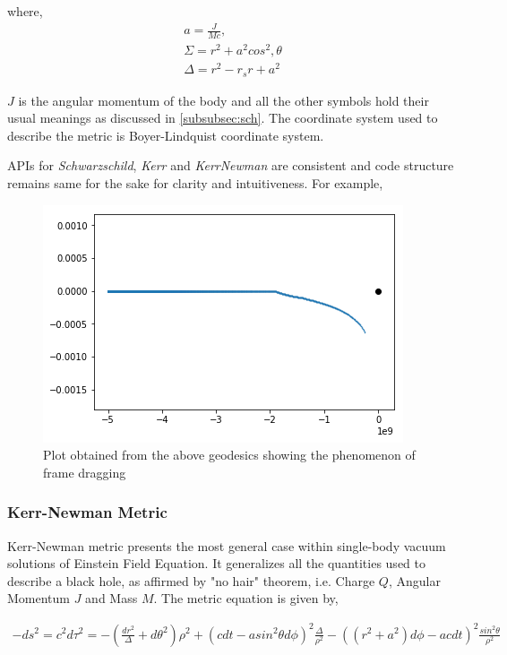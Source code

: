\documentclass[refree]{aa}
\begin{document}
where,
\begin{gather}
a = \frac{J}{Mc}, \nonumber \\
\Sigma = r^2 + a^2 cos^2, \nonumber \theta \\
\Delta  = r^2 - r_s r + a^2 \nonumber
\end{gather}

$J$ is the angular momentum of the body and all the other symbols hold their usual meanings as discussed in \ref{subsubsec:sch}. The coordinate system used to describe the metric is Boyer-Lindquist coordinate system.

APIs for \textit{Schwarzschild}, \textit{Kerr} and \textit{KerrNewman} are consistent and code structure remains same for the sake for clarity and intuitiveness. For example,



\begin{figure}[ht]
	\centering
	\includegraphics[scale=0.5]{figures/drag.png} %
	\caption{Plot obtained from the above geodesics showing the phenomenon of frame dragging}
	\label{fig:kerr}
\end{figure}


\subsubsection{Kerr-Newman Metric}
Kerr-Newman metric \citep{Adamo:2014baa} presents the most general case within single-body vacuum solutions of Einstein Field Equation. It generalizes all the quantities used to describe a black hole, as affirmed by "no hair" theorem, i.e. Charge $Q$, Angular Momentum $J$ and Mass $M$. The metric equation is given by,

\begin{gather}
-ds^2 = c^2 d\tau^2 = -(\frac{dr^2}{\Delta}+d\theta^2)\rho^2 + (c dt - a sin^2 \theta d\phi)^2 \frac{\Delta}{\rho^2} - ((r^2 + a^2)d\phi - ac dt)^2 \frac{sin^2 \theta}{\rho^2}
\end{gather}
\end{document}
